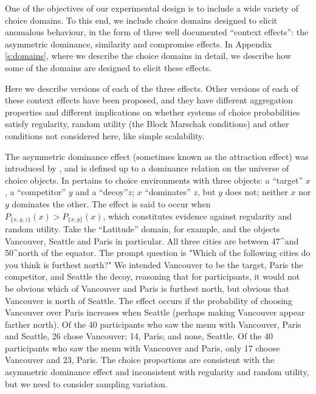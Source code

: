 \documentclass[11pt,letter]{article}
\newcommand{\bin}[2]{P_{\{#1,#2\}}(#1)}
\begin{document}
One of the objectives of our experimental design is to include a wide variety of choice domains.
To this end, we include choice domains designed to elicit anomalous behaviour, in the form of three well documented ``context effects'': the asymmetric dominance, similarity and compromise effects.
In Appendix \ref{s:domains}, where we describe the choice domains in detail, we describe how some of the domains are designed to elicit these effects.

Here we describe versions of each of the three effects.
Other versions of each of these context effects have been proposed, and they have different aggregation properties and different implications on whether systems of choice probabilities satisfy regularity, random utility (the Block Marschak conditions) and other conditions not considered here, like  simple scalability.

The asymmetric dominance effect (sometimes known as the attraction effect) was introduced by , and is defined up to a dominance relation on the universe of choice objects.
In pertains to choice environments with three objects: a ``target'' $x$, a ``competitor'' $y$ and a ``decoy''$z$; $x$ ``dominates'' $z$, but $y$ does not; neither $x$ nor $y$ dominates the other.
The effect is said to occur when $P_{\{x,y,z\}}(x) > \bin{x}{y}$, which constitutes evidence against regularity and random utility.
Take the ``Latitude'' domain, for example, and the objects Vancouver, Seattle and Paris in particular.
All three cities are between 47^\circ and 50^\circ north of the equator.
The prompt question is "Which of the following cities do you think is furthest north?"
We intended Vancouver to be the target, Paris the competitor, and Seattle the decoy, reasoning that for participants, it would not be obvious which of Vancouver and Paris is furthest north, but obvious that Vancouver is north of Seattle.
The effect occurs if the probability of choosing Vancouver over Paris increases when Seattle (perhaps making Vancouver appear farther north).
Of the 40 participants who saw the menu with Vancouver, Paris and Seattle, 26 chose Vancouver; 14, Paris; and none, Seattle.
Of the 40 participants who saw the menu with Vancouver and Paris, only 17 choose Vancouver and 23, Paris.
The choice proportions are consistent with the asymmetric dominance effect and inconsistent with regularity and random utility, but we need to consider sampling variation.
\end{document}
